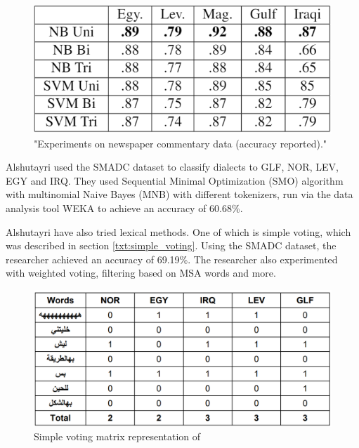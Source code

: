 \documentclass[12pt]{diazessay}
\begin{document}
    \begin{figure}[h]
        \includegraphics[scale=0.6]{Figures/results_extended_AOC.png}
        \caption{"Experiments on newspaper commentary data (accuracy reported)."\cite{cotterell-callison-burch-2014-multi}}
        \label{fig:extended_aoc_results}
    \end{figure}
    
    Alshutayri used the SMADC dataset to classify dialects to GLF, NOR, LEV, EGY and IRQ. They used Sequential Minimal Optimization (SMO) algorithm with multinomial Naive Bayes (MNB) with different tokenizers, run via the data analysis tool WEKA to achieve an accuracy of 60.68\%\cite{alshutayri}.
    
    Alshutayri have also tried lexical methods. One of which is simple voting, which was described in section \ref{txt:simple_voting}. Using the SMADC dataset, the researcher achieved an accuracy of 69.19\%. The researcher also experimented with weighted voting, filtering based on MSA words and more\cite{alshutayri}.
    
    \begin{figure}[h]
        \includegraphics[scale=0.35]{Figures/smadc_simple_voting.png}
        \caption{Simple voting matrix representation of \cite{alshutayri}}
    \end{figure}
        
\end{document}

